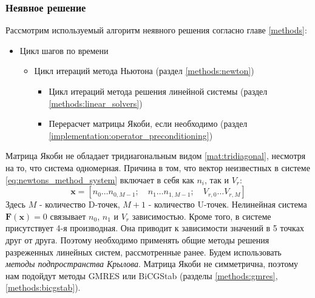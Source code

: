 \subsubsection*{Неявное решение}
Рассмотрим используемый алгоритм неявного решения согласно главе \ref{methods}:
\begin{itemize}
\renewcommand{\labelitemii}{•}
    \item Цикл шагов по времени 
    \begin{itemize}
        \item Цикл итераций метода Ньютона (раздел \ref{methods:newton})
        \begin{itemize}
            \item Цикл итераций метода решения линейной системы (раздел \ref{methods:linear_solvers})
            \item Перерасчет матрицы Якоби, если необходимо (раздел \ref{implementation:operator_preconditioning})
        \end{itemize}
    \end{itemize}
\end{itemize}
Матрица Якоби не обладает тридиагональным видом \eqref{mat:tridiagonal}, несмотря на то, что система одномерная. Причина в том, что вектор неизвестных в системе \eqref{eq:newtons_method_system} включает в себя как $n_i$, так и $V_r$: 
\begin{equation}
\mathbf{x} = \left[ n_0 \dots n_{0, M-1}; \quad n_1 \dots n_{1, M-1}; \quad V_{r, 0} \dots V_{r, M}\right]
\end{equation}
Здесь  $M$ - количество D-точек, $M+1$ - количество U-точек. Нелинейная система $\mathbf{F}(\mathbf{x}) = 0$ связывает $n_0$, $n_1$ и $V_r$ зависимостью. Кроме того, в системе присутствует 4-я производная. Она приводит к зависимости значений в 5 точках друг от друга. Поэтому необходимо применять общие методы решения разреженных линейных систем, рассмотренные ранее. Будем использовать  \textit{методы подпространства Крылова}. Матрица Якоби не симметрична, поэтому нам подойдут методы GMRES или BiCGStab (разделы \ref{methods:gmres}, \ref{methods:bicgstab}).
